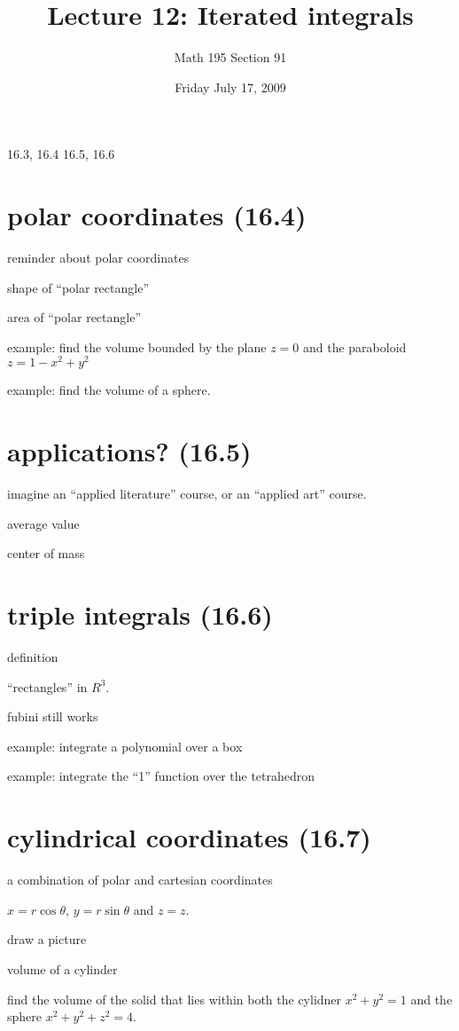 \documentclass[12pt]{article}
\title{Lecture 12: Iterated integrals}
\author{Math 195 Section 91}
\date{Friday July 17, 2009}
\begin{document}
\maketitle

16.3, 16.4
16.5, 16.6

\section{polar coordinates (16.4)}

reminder about polar coordinates

shape of ``polar rectangle''

area of ``polar rectangle''

example: find the volume bounded by the plane $z = 0$ and the paraboloid $z = 1 - x^2 + y^2$

example: find the volume of a sphere.

\section{applications? (16.5)}

imagine an ``applied literature'' course, or an ``applied art'' course.

average value

center of mass

\section{triple integrals (16.6)}

definition

``rectangles'' in $R^3$.

fubini still works

example: integrate a polynomial over a box

example: integrate the ``1'' function over the tetrahedron

\section{cylindrical coordinates (16.7)}

a combination of polar and cartesian coordinates

$x = r \cos \theta$, $y = r \sin \theta$ and $z = z$.

draw a picture

volume of a cylinder

find the volume of the solid that lies within both the cylidner $x^2 + y^2 = 1$ and the sphere $x^2 + y^2 + z^2 = 4$.
\end{document}
